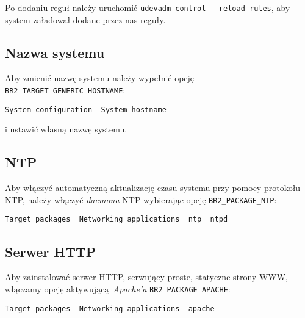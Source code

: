 \documentclass{article}
\begin{document}
Po dodaniu reguł należy uruchomić \texttt{udevadm control -{}-reload-rules}, aby system załadował dodane przez nas reguły.


\subsection{Nazwa systemu}

Aby zmienić nazwę systemu należy wypełnić opcję \texttt{ BR2\_TARGET\_GENERIC\_HOSTNAME}:

\begin{center}
\texttt{System configuration \textrightarrow\ System hostname}
\end{center}

\noindent i ustawić własną nazwę systemu.


\subsection{NTP}

Aby włączyć automatyczną aktualizację czasu systemu przy pomocy protokołu NTP, należy włączyć \emph{daemona} NTP wybierając opcję \texttt{BR2\_PACKAGE\_NTP}:

\begin{center}
\texttt{Target packages \textrightarrow\ Networking applications \textrightarrow\ ntp \textrightarrow\ ntpd}
\end{center}


\subsection{Serwer HTTP}

Aby zainstalować serwer HTTP, serwujący proste, statyczne strony WWW, włączamy opcję aktywującą~\emph{Apache'a} \texttt{BR2\_PACKAGE\_APACHE}:

\begin{center}
\texttt{Target packages \textrightarrow\ Networking applications \textrightarrow\ apache}
\end{center}

\end{document}
